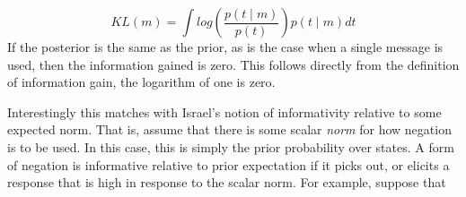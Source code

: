 \documentclass[12pt]{upenndiss}
\theoremstyle{definition} \newtheorem{definition}{Definition}
\begin{document}
\begin{equation}
     KL(m) = \int log\left( \frac{p(t \mid m)}{p(t)}  \right)p(t \mid m) dt
\end{equation}
If the posterior is the same as the prior, as is the case when a single message is used, then the information gained is zero. This follows directly from the definition of information gain, the logarithm of one is zero.

Interestingly this matches with Israel's \citeyearpar{israel2001} notion of informativity relative to some expected norm. That is, assume that there is some scalar \emph{norm} for how negation is to be used. In this case, this is simply the prior probability over states. A form of negation is informative relative to prior expectation if it picks out, or elicits a response that is  high in response to the scalar norm. For example, suppose that 



\end{document}
